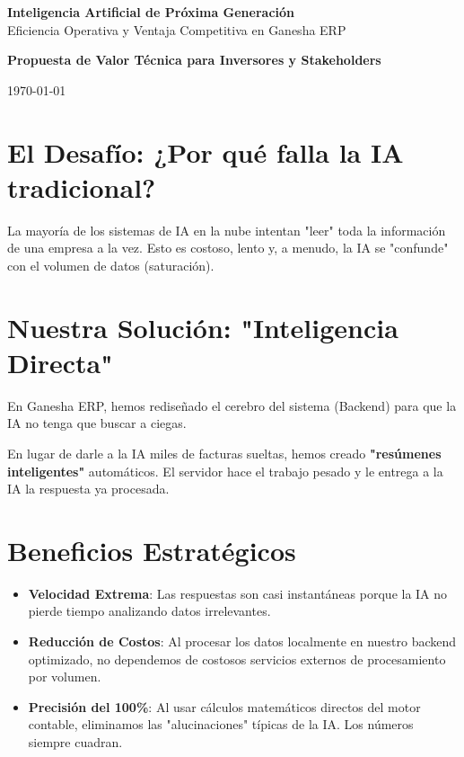 \documentclass[a4paper,12pt]{article}
\begin{document}
\begin{titlepage}
    \centering
    \vspace*{2cm}
    {\Huge\bfseries\color{investorblue} Inteligencia Artificial de Próxima Generación}\\[0.5cm]
    {\Large\color{successgreen} Eficiencia Operativa y Ventaja Competitiva en Ganesha ERP}\\[2cm]
    
    \begin{tcolorbox}[colback=investorblue,colframe=investorblue,arc=8pt,left=20pt,right=20pt,top=20pt,bottom=20pt]
        \centering
        \color{white}
        \textbf{Propuesta de Valor Técnica para Inversores y Stakeholders}
    \end{tcolorbox}
    
    \vfill
    {\large \today}
\end{titlepage}

\section{El Desafío: ¿Por qué falla la IA tradicional?}
La mayoría de los sistemas de IA en la nube intentan "leer" toda la información de una empresa a la vez. Esto es costoso, lento y, a menudo, la IA se "confunde" con el volumen de datos (saturación).

\section{Nuestra Solución: "Inteligencia Directa"}
En Ganesha ERP, hemos rediseñado el cerebro del sistema (Backend) para que la IA no tenga que buscar a ciegas.

\begin{tcolorbox}[title=Innovación Clave: Canales de Datos Optimizados, colback=successgreen!5, colframe=successgreen]
    En lugar de darle a la IA miles de facturas sueltas, hemos creado \textbf{"resúmenes inteligentes"} automáticos. El servidor hace el trabajo pesado y le entrega a la IA la respuesta ya procesada.
\end{tcolorbox}

\section{Beneficios Estratégicos}
\begin{itemize}
    \item \textbf{Velocidad Extrema}: Las respuestas son casi instantáneas porque la IA no pierde tiempo analizando datos irrelevantes.
    \item \textbf{Reducción de Costos}: Al procesar los datos localmente en nuestro backend optimizado, no dependemos de costosos servicios externos de procesamiento por volumen.
    \item \textbf{Precisión del 100\%}: Al usar cálculos matemáticos directos del motor contable, eliminamos las "alucinaciones" típicas de la IA. Los números siempre cuadran.
\end{itemize}
\end{document}
